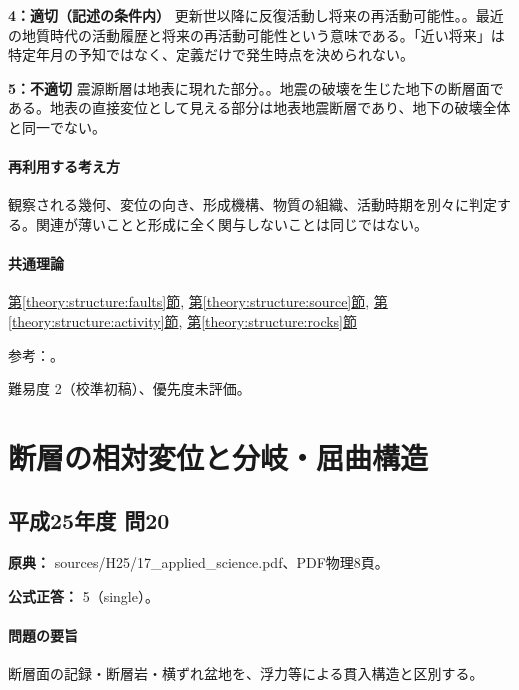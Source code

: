 \noindent\textbf{4：適切（記述の条件内）} 更新世以降に反復活動し将来の再活動可能性。。最近の地質時代の活動履歴と将来の再活動可能性という意味である。「近い将来」は特定年月の予知ではなく、定義だけで発生時点を決められない。\par

\noindent\textbf{5：不適切} 震源断層は地表に現れた部分。。地震の破壊を生じた地下の断層面である。地表の直接変位として見える部分は地表地震断層であり、地下の破壊全体と同一でない。\par

\paragraph{再利用する考え方} 観察される幾何、変位の向き、形成機構、物質の組織、活動時期を別々に判定する。関連が薄いことと形成に全く関与しないことは同じではない。

\paragraph{共通理論} \hyperref[theory:structure:faults]{第\ref*{theory:structure:faults}節}, \hyperref[theory:structure:source]{第\ref*{theory:structure:source}節}, \hyperref[theory:structure:activity]{第\ref*{theory:structure:activity}節}, \hyperref[theory:structure:rocks]{第\ref*{theory:structure:rocks}節}

\par 参考：\cite{str_source,str_faultrocks,str_activity}。

\par 難易度 2（校準初稿）、優先度未評価。

\section{断層の相対変位と分岐・屈曲構造}

\subsection{平成25年度 問20}
\label{q:h25-reg-applied-20}

\noindent\textbf{原典：} sources/H25/17\_applied\_science.pdf、PDF物理8頁。

\textbf{公式正答：} 5（single）。

\paragraph{問題の要旨} 断層面の記録・断層岩・横ずれ盆地を、浮力等による貫入構造と区別する。

